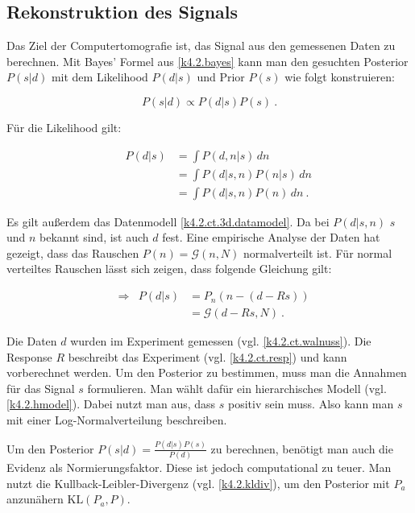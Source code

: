 \subsection{Rekonstruktion des Signals}

Das Ziel der Computertomografie ist, das Signal aus den gemessenen Daten zu berechnen. Mit Bayes' Formel aus \cref{k4.2.bayes} kann man den gesuchten Posterior $P(s|d)$ mit dem Likelihood $P(d|s)$ und Prior $P(s)$ wie folgt konstruieren:

\begin{equation}
  P(s|d) \propto P(d|s)P(s)\ .
\end{equation}

Für die Likelihood gilt:

\begin{equation}
  \begin{aligned}
    && P(d|s) &= \int P(d,n|s) \,dn  \\
    &&  &= \int P(d|s,n) P(n|s) \,dn \\
    && &= \int P(d|s,n) P(n) \,dn \ .
  \end{aligned}
\end{equation}

Es gilt außerdem das Datenmodell \cref{k4.2.ct.3d.datamodel}. Da bei $P(d|s,n)$ $s$ und $n$ bekannt sind, ist auch $d$ fest. Eine empirische Analyse der Daten hat gezeigt, dass das Rauschen $P(n) = \mathcal{G}(n,N)$ normalverteilt ist. Für normal verteiltes Rauschen lässt sich zeigen, dass folgende Gleichung gilt:

\begin{equation}
  \begin{aligned}
    &\Rightarrow& P(d|s) &= P_n(n-(d-Rs)) \\ 
    && &= \mathcal{G}(d-Rs,N) \ .
  \end{aligned}
\end{equation}

Die Daten $d$ wurden im Experiment gemessen (vgl. \cref{k4.2.ct.walnuss}). Die Response $R$ beschreibt das Experiment (vgl. \cref{k4.2.ct.resp}) und kann vorberechnet werden. Um den Posterior zu bestimmen, muss man die Annahmen für das Signal $s$ formulieren. Man wählt dafür ein hierarchisches Modell (vgl. \cref{k4.2.hmodel}). Dabei nutzt man aus, dass $s$ positiv sein muss. Also kann man $s$ mit einer Log-Normalverteilung beschreiben. 

Um den Posterior $P(s|d) = \frac{P(d|s)P(s)}{P(d)}$ zu berechnen, benötigt man auch die Evidenz als Normierungsfaktor. Diese ist jedoch computational zu teuer. Man nutzt die Kullback-Leibler-Divergenz (vgl. \cref{k4.2.kldiv}), um den Posterior mit $P_a$ anzunähern $\mathrm{KL}(P_a,P)$. 



